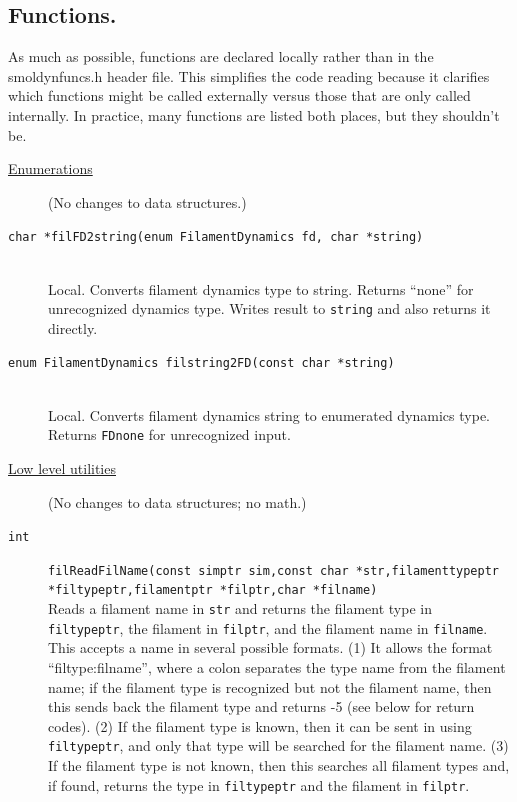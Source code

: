 \documentclass {scrbook}
\newcommand {\ttt} {\texttt}
\begin{document}
\subsection{Functions.}
As much as possible, functions are declared locally rather than in the smoldynfuncs.h header file. This simplifies the code reading because it clarifies which functions might be called externally versus those that are only called internally. In practice, many functions are listed both places, but they shouldn't be.

\begin{description}

\item[\underline{Enumerations}]
(No changes to data structures.)

\item[\ttt{char *filFD2string(enum FilamentDynamics fd, char *string)}]
\hfill \\
Local. Converts filament dynamics type to string. Returns ``none'' for unrecognized dynamics type. Writes result to \ttt{string} and also returns it directly.

\item[\ttt{enum FilamentDynamics filstring2FD(const char *string)}]
\hfill \\
Local. Converts filament dynamics string to enumerated dynamics type. Returns \ttt{FDnone} for unrecognized input.


\item[\underline{Low level utilities}]
(No changes to data structures; no math.)

\item[\ttt{int}]
\ttt{filReadFilName(const simptr sim,const char *str,filamenttypeptr *filtypeptr,filamentptr *filptr,char *filname)}
\hfill \\
Reads a filament name in \ttt{str} and returns the filament type in \ttt{filtypeptr}, the filament in \ttt{filptr}, and the filament name in \ttt{filname}. This accepts a name in several possible formats. (1) It allows the format ``filtype:filname'', where a colon separates the type name from the filament name; if the filament type is recognized but not the filament name, then this sends back the filament type and returns -5 (see below for return codes). (2) If the filament type is known, then it can be sent in using \ttt{filtypeptr}, and only that type will be searched for the filament name. (3) If the filament type is not known, then this searches all filament types and, if found, returns the type in \ttt{filtypeptr} and the filament in \ttt{filptr}.


\end{description}
\end{document}
